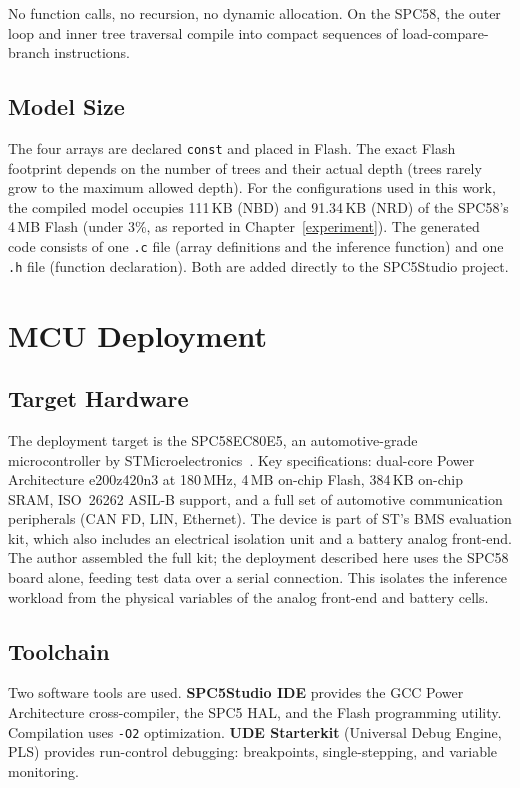 No function calls, no recursion, no dynamic allocation. On the SPC58, the outer loop and inner tree traversal compile into compact sequences of load-compare-branch instructions.

\subsection{Model Size}

The four arrays are declared \texttt{const} and placed in Flash. The exact Flash footprint depends on the number of trees and their actual depth (trees rarely grow to the maximum allowed depth). For the configurations used in this work, the compiled model occupies 111\,KB (NBD) and 91.34\,KB (NRD) of the SPC58's 4\,MB Flash (under 3\%, as reported in Chapter~\ref{experiment}). The generated code consists of one \texttt{.c} file (array definitions and the inference function) and one \texttt{.h} file (function declaration). Both are added directly to the SPC5Studio project.


\section{MCU Deployment}
\label{sec:ch3_deployment}

\subsection{Target Hardware}

The deployment target is the SPC58EC80E5, an automotive-grade microcontroller by STMicroelectronics~\autocite{spc58ec80e5_ds}. Key specifications: dual-core Power Architecture e200z420n3 at 180\,MHz, 4\,MB on-chip Flash, 384\,KB on-chip SRAM, ISO~26262 ASIL-B support, and a full set of automotive communication peripherals (CAN FD, LIN, Ethernet). The device is part of ST's BMS evaluation kit, which also includes an electrical isolation unit and a battery analog front-end. The author assembled the full kit; the deployment described here uses the SPC58 board alone, feeding test data over a serial connection. This isolates the inference workload from the physical variables of the analog front-end and battery cells.

\subsection{Toolchain}

Two software tools are used. \textbf{SPC5Studio IDE} provides the GCC Power Architecture cross-compiler, the SPC5 \gls{HAL}, and the Flash programming utility. Compilation uses \texttt{-O2} optimization. \textbf{UDE Starterkit} (Universal Debug Engine, PLS) provides run-control debugging: breakpoints, single-stepping, and variable monitoring.


